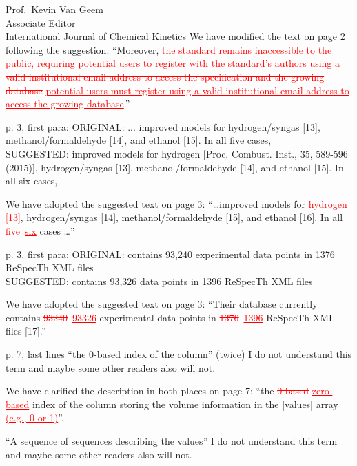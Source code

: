 \documentclass[11pt]{OSUletter}
\newcommand{\addtwo}[1]{{\sloppy\textcolor{red}{\uline{#1}}}}  %
\newcommand{\deletetwo}[1]{\sloppy\textcolor{red}{\sout{#1}}}    %
\begin{document}
\begin{letter}{
               Prof.~Kevin Van Geem\\
               Associate Editor\\
               International Journal of Chemical Kinetics
               }
We have modified the text on page 2 following the suggestion:
``Moreover, \deletetwo{the standard remains inaccessible to the public, requiring potential users
to register with the standard's authors using a valid institutional email address
to access the specification and the growing database}
\addtwo{potential users must register using a valid institutional email address
to access the growing database}.''

\begin{quoting}
    p. 3, first para:
    ORIGINAL:
    ... improved models for hydrogen/syngas [13], methanol/formaldehyde [14], and
    ethanol [15]. In all five cases, \\
    SUGGESTED:
    improved models for hydrogen [Proc. Combust. Inst.,  35, 589-596 (2015)],
    hydrogen/syngas [13], methanol/formaldehyde [14], and ethanol [15]. In all six cases,
\end{quoting}

We have adopted the suggested text on page 3:
``\ldots improved models for \addtwo{hydrogen [13]},
hydrogen\slash syngas [14], methanol\slash formaldehyde [15],
and ethanol [16]. In all \deletetwo{five}~\addtwo{six} cases \ldots''


\begin{quoting}
    p. 3, first para:
    ORIGINAL:
    contains 93,240 experimental data points in 1376 ReSpecTh XML files\\
    SUGGESTED:
    contains 93,326 data points in 1396 ReSpecTh XML files
\end{quoting}

We have adopted the suggested text on page 3:
``Their database currently contains \deletetwo{\num{93240}}~\addtwo{\num{93326}}
experimental data points in \deletetwo{1376}~\addtwo{1396}
ReSpecTh XML files [17].''

\begin{quoting}
    p. 7, last lines
    ``the 0-based index of the column'' (twice)
    I do not understand this term and maybe some other readers also will not.
\end{quoting}

We have clarified the description in both places on page 7:
``the \deletetwo{0-based} \addtwo{zero-based} index of the column storing the
volume information in the \yabox|values| array \addtwo{(e.g., 0 or 1)}''.

\begin{quoting}
    ``A sequence of sequences describing the values''
    I do not understand this term and maybe some other readers also will not.
\end{quoting}


\end{letter}
\end{document}
